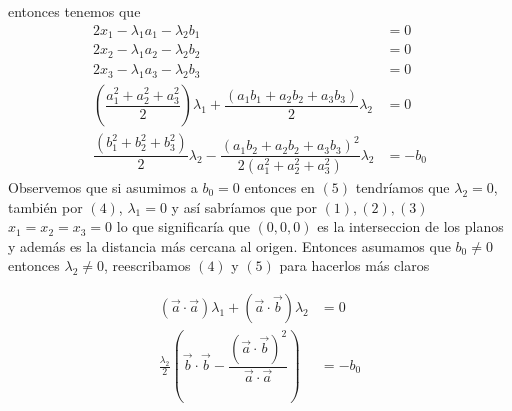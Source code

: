 \documentclass[letterpaper]{article}
\renewcommand{\l}{\lambda}
\renewcommand{\*}{\cdot}
\theoremstyle{definition}
\begin{document}
entonces tenemos que 
\setcounter{equation}{0}
\begin{align}
	2x_1 - \l_1 a_1 - \l_2 b_1 &= 0\\
	2x_2 - \l_1 a_2 - \l_2 b_2 &= 0\\
	2x_3 - \l_1 a_3 - \l_2 b_3 &= 0\\
	\left( \dfrac{a_1^2 + a_2^2 + a_3^2}{2} \right)\l_1 + \dfrac{(a_1 b_1 + a_2 b_2 + a_3 b_3)}{2}\l_2 &= 0\\
	\dfrac{(b_1^2 + b_2^2 + b_3^2 )}{2} \l_2 - \dfrac{(a_1 b_2 + a_2 b_2 + a_3 b_3)^2}{2(a_1^2 + a_2^2 + a_3^2)}\l_2 &= -b_0 
\end{align}
Observemos que si asumimos a $ b_0 = 0 $ entonces en $ (5) $ tendríamos que $ \l_2 = 0 $, también por $ (4) $, $ \lambda_1 = 0 $ y así sabríamos que por $ (1),(2),(3) $ $ x_1 = x_2 = x_3 = 0 $ lo que significaría que $ (0,0,0) $ es la interseccion de los planos y además es la distancia más cercana al origen. Entonces asumamos que $ b_0 \neq 0 $ entonces $ \l_2 \neq 0 $, reescribamos $ (4) $ y $ (5) $ para hacerlos más claros

\begin{align*}
	(\vec{a} \* \vec{a}) \l_1 + (\vec{a} \* \vec{b}) \l_2 &= 0 \label{eq:penUltima}\tag{4}\\
	\frac{\l_2}{2}\left( \vec{b}\* \vec{b} - \dfrac{(\vec{a} \* \vec{b})^2}{\vec{a} \* \vec{a}} \right) &= -b_0 \label{eq:Ultima}\tag{5}
\end{align*}
\end{document}
